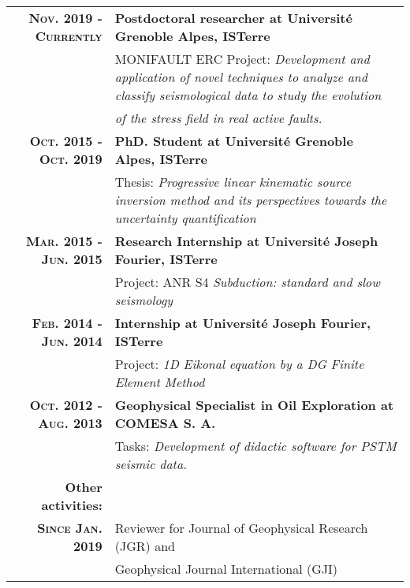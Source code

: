 \documentclass[a4paper,10.5pt]{article} %
\begin{document}
\begin{tabular}{rp{11cm}}

{\bf \textsc{Nov. 2019 - Currently }} & {\bf Postdoctoral researcher at Universit\'e Grenoble Alpes, ISTerre} \\
& MONIFAULT ERC Project: \emph{Development and application of novel techniques to analyze and classify seismological data to study the evolution} \\
& \emph{of the stress field in real active faults.}  \\[0.6em] 

{\bf \textsc{Oct. 2015 - Oct. 2019}} & {\bf PhD. Student at Universit\'e Grenoble Alpes, ISTerre} \\
& Thesis: \emph{Progressive linear kinematic source inversion
method and its perspectives towards the
uncertainty quantification} \\[0.6em] 

{\bf \textsc{Mar. 2015 - Jun. 2015}} & {\bf Research Internship at Universit\'e Joseph Fourier, ISTerre} \\
& Project:  ANR S4 \emph{Subduction: standard and slow seismology}\\[0.6em]

{\bf \textsc{Feb. 2014 - Jun. 2014}} & {\bf Internship at Universit\'e Joseph Fourier, ISTerre} \\
& Project: \emph{1D Eikonal equation by a DG Finite Element Method}\\[0.6em]

{\bf \textsc{Oct. 2012 - Aug. 2013}} & {\bf Geophysical Specialist in Oil Exploration at \textsc{COMESA S. A.}} \\
& Tasks: \emph{Development of didactic software for PSTM seismic data.}\\[0.6em]
{\bf Other activities:}\\[0.6em]
{\bf \textsc{Since Jan.} 2019} & Reviewer for Journal of Geophysical Research (JGR) and \\
			       & Geophysical Journal International (GJI)\\[0.6em]
\end{tabular}
\end{document}
